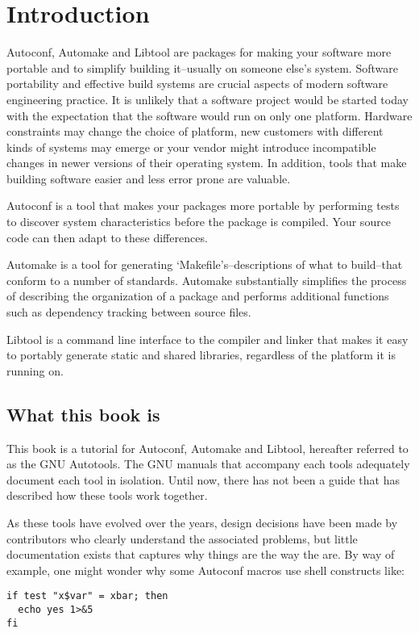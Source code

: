 \chapter{Introduction}
Autoconf, Automake and Libtool are packages for making your software more portable and to simplify building it--usually on someone else's system. Software portability and effective build systems are crucial aspects of modern software engineering practice. It is unlikely that a software project would be started today with the expectation that the software would run on only one platform. Hardware constraints may change the choice of platform, new customers with different kinds of systems may emerge or your vendor might introduce incompatible changes in newer versions of their operating system. In addition, tools that make building software easier and less error prone are valuable. 


Autoconf is a tool that makes your packages more portable by performing tests to discover system characteristics before the package is compiled. Your source code can then adapt to these differences. 


Automake is a tool for generating `Makefile's--descriptions of what to build--that conform to a number of standards. Automake substantially simplifies the process of describing the organization of a package and performs additional functions such as dependency tracking between source files. 


Libtool is a command line interface to the compiler and linker that makes it easy to portably generate static and shared libraries, regardless of the platform it is running on. 

\section{What this book is}
This book is a tutorial for Autoconf, Automake and Libtool, hereafter referred to as the GNU Autotools. The GNU manuals that accompany each tools adequately document each tool in isolation. Until now, there has not been a guide that has described how these tools work together. 

As these tools have evolved over the years, design decisions have been made by contributors who clearly understand the associated problems, but little documentation exists that captures why things are the way the are. By way of example, one might wonder why some Autoconf macros use shell constructs like: 

\begin{verbatim}
if test "x$var" = xbar; then
  echo yes 1>&5
fi
\end{verbatim}

